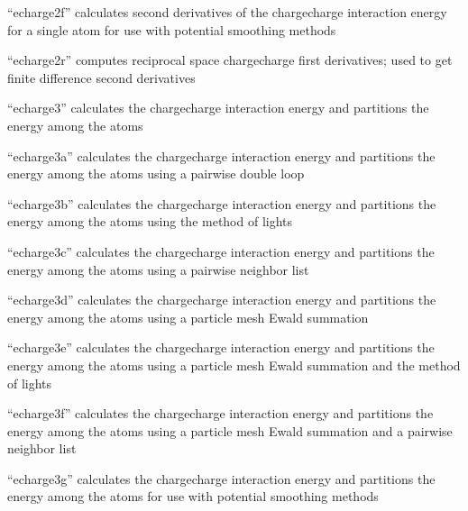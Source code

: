 \documentclass[letterpaper,11pt,english]{sphinxmanual}
\begin{document}

“echarge2f” calculates second derivatives of the charge\sphinxhyphen{}charge
interaction energy for a single atom for use with potential
smoothing methods


“echarge2r” computes reciprocal space charge\sphinxhyphen{}charge first
derivatives; used to get finite difference second derivatives


“echarge3” calculates the charge\sphinxhyphen{}charge interaction energy
and partitions the energy among the atoms


“echarge3a” calculates the charge\sphinxhyphen{}charge interaction energy
and partitions the energy among the atoms using a pairwise
double loop


“echarge3b” calculates the charge\sphinxhyphen{}charge interaction energy
and partitions the energy among the atoms using the method
of lights


“echarge3c” calculates the charge\sphinxhyphen{}charge interaction energy
and partitions the energy among the atoms using a pairwise
neighbor list


“echarge3d” calculates the charge\sphinxhyphen{}charge interaction energy
and partitions the energy among the atoms using a particle
mesh Ewald summation


“echarge3e” calculates the charge\sphinxhyphen{}charge interaction energy
and partitions the energy among the atoms using a particle
mesh Ewald summation and the method of lights


“echarge3f” calculates the charge\sphinxhyphen{}charge interaction energy
and partitions the energy among the atoms using a particle
mesh Ewald summation and a pairwise neighbor list


“echarge3g” calculates the charge\sphinxhyphen{}charge interaction energy
and partitions the energy among the atoms for use with
potential smoothing methods
\end{document}

